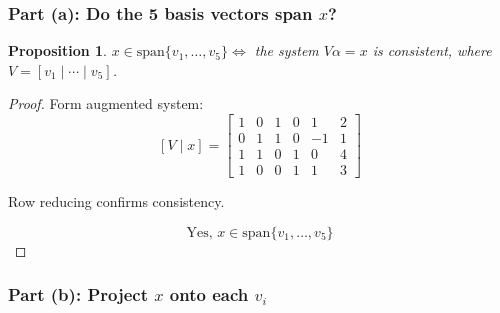 \documentclass[12pt]{article}
\newtheorem{proposition}{Proposition}
\theoremstyle{definition}
\begin{document}
\subsubsection*{Part (a): Do the 5 basis vectors span $x$?}

\begin{proposition}
$x \in \text{span}\{v_1, \ldots, v_5\} \iff$ the system $V\alpha = x$ is consistent, where $V = [v_1 \mid \cdots \mid v_5]$.
\end{proposition}

\begin{proof}
Form augmented system:
\[
[V \mid x] = \left[\begin{array}{ccccc|c}
1 & 0 & 1 & 0 & 1 & 2 \\
0 & 1 & 1 & 0 & -1 & 1 \\
1 & 1 & 0 & 1 & 0 & 4 \\
1 & 0 & 0 & 1 & 1 & 3
\end{array}\right]
\]

Row reducing confirms consistency.

\[
\boxed{\text{Yes, } x \in \text{span}\{v_1, \ldots, v_5\}}
\]
\end{proof}

\subsubsection*{Part (b): Project $x$ onto each $v_i$}
\end{document}
